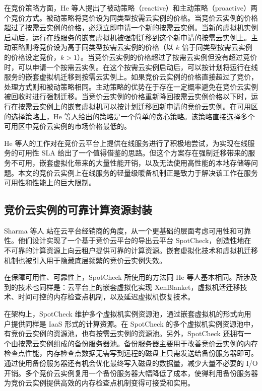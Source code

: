 在竞价策略方面，He 等人提出了被动策略（reactive）和主动策略（proactive）两个竞价方式。被动策略将竞价设为同类型按需云实例的价格。当竞价云实例的价格超过了按需云实例的价格，必须立即申请一个新的按需云实例。当新的虚拟机实例启动后，运行在线服务的嵌套虚拟机被强制迁移到这个新申请的按需云实例上。主动策略则将竞价设为高于同类型按需云实例的价格（以 $k$ 倍于同类型按需云实例的价格设定竞价，$k > 1$）。当竞价云实例的价格超过了按需云实例但没有超过竞价时，可以申请一个按需云实例。在这个按需云实例启动后，可以按计划将运行在线服务的嵌套虚拟机迁移到按需云实例上。如果竞价云实例的价格直接超过了竞价，处理方式则和被动策略相同。主动策略的优势在于存在一定概率避免在竞价云实例被回收时进行强制迁移。当竞价云实例的价格重新降回按需云实例价格以下时，运行在按需云实例上的嵌套虚拟机可以按计划迁移回新申请的竞价云实例。在可用区的选择策略上，He 等人给出的策略是一个简单的贪心策略。该策略直接选择多个可用区中竞价云实例的市场价格最低的。

He 等人的工作对在竞价云平台上提供在线服务进行了积极地尝试，为实现在线服务的可用性 SLA 给出了一个值得借鉴的思路。但这个方案存在强制迁移带来的服务不可用，嵌套虚拟化带来的大量性能开销，以及无法使用高性能的本地存储等问题。本文的竞价云实例上在线服务的轻量级暖备机制正是致力于解决该工作在服务可用性和性能上的巨大限制。

\subsection{竞价云实例的可靠计算资源封装}
Sharma 等人 \cite{Sharma:2015:SDD:2741948.2741953} 站在云平台经销商的角度，从一个更基础的层面考虑可用性和可靠性。他们设计实现了一个基于竞价云平台的导出云平台 SpotCheck，创造性地在不可靠的计算资源上向云租户提供可靠的计算资源。嵌套虚拟化技术和虚拟机迁移机制也被引入用于隐藏底层频繁的竞价云实例失效。

在保障可用性、可靠性上，SpotCheck 所使用的方法同 He 等人基本相同。所涉及到的技术也同样是：云平台上的嵌套虚拟化实现 XenBlanket，虚拟机活迁移技术、时间可控的内存检查点机制，以及延迟虚拟机恢复技术。

在架构上，SpotCheck 维护多个虚拟机实例资源池，通过嵌套虚拟机的形式向用户提供同样是 IaaS 形式的计算资源。在 SpotCheck 的多个虚拟机实例资源池中，有竞价云实例的资源池，也有按需云实例的资源池。另外，SpotCheck 还拥有一个由按需云实例组成的备份服务器池。备份服务器主要用于改善竞价云实例的内存检查点性能，内存检查点数据无需写到远程的磁盘上只需发送给备份服务器即可。通过使用备份服务器还有机会优化最终写入磁盘的数据量，减少大量不必要的 I/O 开销。多个竞价云实例复用一个备份服务器大幅降低了成本，使得利用备份服务器为竞价云实例提供高效的内存检查点机制变得可接受和实用。

